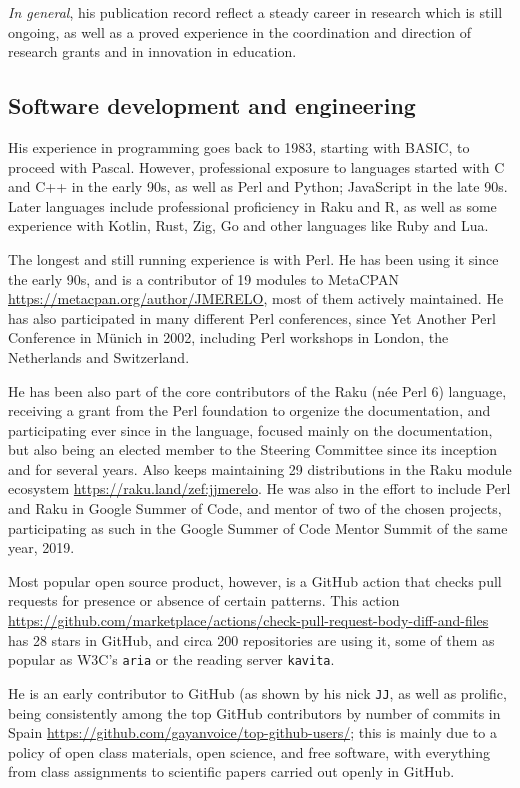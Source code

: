 \documentclass[a4paper]{article}
\begin{document}
{\em In general}, his publication record reflect a steady career in research
which is still ongoing, as well as a proved experience in the coordination and
direction of research grants and in innovation in education.

\subsection{Software development and engineering}

His experience in programming goes back to 1983, starting with BASIC, to proceed
with Pascal. However, professional exposure to languages started with C and C++
in the early 90s, as well as Perl and Python; JavaScript in the late 90s. Later
languages include professional proficiency in Raku and R, as well as some
experience with Kotlin, Rust, Zig, Go and other languages like Ruby and Lua.

The longest and still running experience is with Perl. He has been using it
since the early 90s, and is a contributor of 19 modules to MetaCPAN
\url{https://metacpan.org/author/JMERELO}, most of them actively maintained. He
has also participated in many different Perl conferences, since Yet Another Perl
Conference in Münich in 2002, including Perl workshops in London, the
Netherlands and Switzerland.

He has been also part of the core contributors of the Raku (née Perl 6)
language, receiving a grant from the Perl foundation to orgenize the
documentation, and participating ever since in the language, focused mainly on
the documentation, but also being an elected member to the Steering Committee
since its inception and for several years. Also keeps maintaining 29
distributions in the Raku module ecosystem
\url{https://raku.land/zef:jjmerelo}. He was also in the effort to include Perl
and Raku in Google Summer of Code, and mentor of two of the chosen projects,
participating as such in the Google Summer of Code Mentor Summit of the same
year, 2019.

Most popular open source product, however, is a GitHub action that checks pull
requests for presence or absence of certain patterns. This action
\url{https://github.com/marketplace/actions/check-pull-request-body-diff-and-files}
has 28 stars in GitHub, and circa 200 repositories are using it, some of them as
popular as W3C's {\tt aria} or the reading server {\tt kavita}.

He is an early contributor to GitHub (as shown by his nick {\tt JJ}, as well as
prolific, being consistently among the top GitHub contributors by number of
commits in Spain
\url{https://github.com/gayanvoice/top-github-users/}; this is mainly due to a
policy of open class materials, open science, and free software, with everything
from class assignments to scientific papers carried out openly in GitHub.
\end{document}
